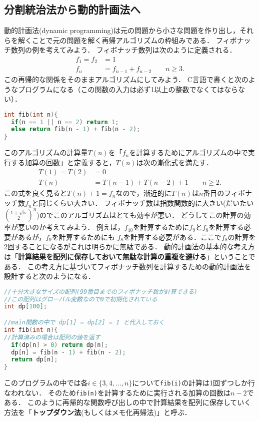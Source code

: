 \documentclass[a4paper,twoside,onecolumn,openany,article]{memoir}
\theoremstyle{remark}
\begin{document}
\subsection{分割統治法から動的計画法へ}
動的計画法(dynamic programming)は元の問題から小さな問題を作り出し，それらを解くことで元の問題を解く再帰アルゴリズムの枠組みである．
フィボナッチ数列の例を考えてみよう．
フィボナッチ数列は次のように定義される．
\begin{align*}
f_1=f_2&=1\\
f_n&=f_{n-1}+f_{n-2}\qquad n\ge 3.
\end{align*}
この再帰的な関係をそのままアルゴリズムにしてみよう．
C言語で書くと次のようなプログラムになる（この関数の入力は必ず1以上の整数でなくてはならない）．
\begin{lstlisting}[basicstyle=\ttfamily\small,showstringspaces=false,language=C,frame=single]
int fib(int n){
  if(n == 1 || n == 2) return 1;
  else return fib(n - 1) + fib(n - 2);
}
\end{lstlisting}
このアルゴリズムの計算量$T(n)$を「$f_n$を計算するためにアルゴリズムの中で実行する加算の回数」と定義すると，$T(n)$は次の漸化式を満たす．
\begin{align*}
T(1)=T(2)&=0\\
T(n)&=T(n-1)+T(n-2) + 1\qquad n\ge 2.
\end{align*}
この式を良く見ると$T(n)+1=f_n$なので，漸近的に$T(n)$は$n$番目のフィボナッチ数$f_n$と同じくらい大きい．
フィボナッチ数は指数関数的に大きい(だいたい$\left(\frac{1+\sqrt{5}}2\right)^n$)のでこのアルゴリズムはとても効率が悪い．
どうしてこの計算の効率が悪いのか考えてみよう．
例えば，$f_{10}$を計算するために$f_9$と$f_8$を計算する必要があるが，$f_9$を計算するためにも
$f_8$を計算する必要がある．ここで$f_8$の計算を2回することになるがこれは明らかに無駄である．
動的計画法の基本的な考え方は「\textbf{計算結果を配列に保存しておいて無駄な計算の重複を避ける}」ということである．
この考え方に基づいてフィボナッチ数列を計算するための動的計画法を設計すると次のようになる．
\begin{lstlisting}[basicstyle=\ttfamily\small,showstringspaces=false,language=C,frame=single]
//十分大きなサイズの配列(99番目までのフィボナッチ数が計算できる)
//この配列はグローバル変数なので0で初期化されている
int dp[100];

//main関数の中で dp[1] = dp[2] = 1 と代入しておく
int fib(int n){
//計算済みの場合は配列の値を返す
  if(dp[n] > 0) return dp[n];
  dp[n] = fib(n - 1) + fib(n - 2);
  return dp[n];
}
\end{lstlisting}
このプログラムの中では各$i\in \{3,4,\dotsc, n\}$について\texttt{fib(i)}の計算は1回ずつしか行なわれない．
そのため\texttt{fib(n)}を計算するために実行される加算の回数は$n-2$である．
このように再帰的な関数呼び出しの中で計算結果を配列に保存していく方法を「\textbf{トップダウン法}(もしくはメモ化再帰法)」と呼ぶ．
\end{document}
